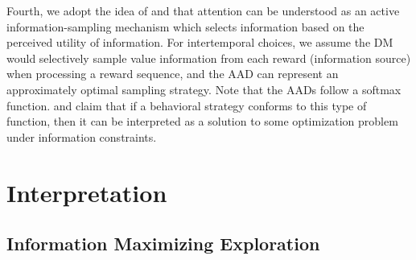 \documentclass[
  12pt,
]{article}
\begin{document}
Fourth, we adopt the idea of \citet{gottlieb2012attention} and
\citet{gottlieb2013information} that attention can be understood as an
active information-sampling mechanism which selects information based on
the perceived utility of information. For intertemporal choices, we
assume the DM would selectively sample value information from each
reward (information source) when processing a reward sequence, and the
AAD can represent an approximately optimal sampling strategy. Note that
the AADs follow a softmax function. \citet{matvejka2015rational} and
\citet{mackowiak2023rational} claim that if a behavioral strategy
conforms to this type of function, then it can be interpreted as a
solution to some optimization problem under information constraints.

\hypertarget{interpretation}{%
\section{Interpretation}\label{interpretation}}

\hypertarget{information-maximizing-exploration}{%
\subsection{\texorpdfstring{Information Maximizing Exploration
\label{info_exploration}}{Information Maximizing Exploration }}\label{information-maximizing-exploration}}
\end{document}
